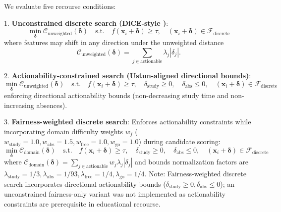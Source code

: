 \documentclass[11pt]{article}
\begin{document}
We evaluate five recourse conditions:

1. \textbf{Unconstrained discrete search (DiCE-style \cite{Mothilal2020})}:
\begin{equation}
\min_{\boldsymbol{\delta}} \mathcal{C}_{\text{unweighted}}(\boldsymbol{\delta}) \quad \text{s.t.} \quad f(\mathbf{x}_i + \boldsymbol{\delta}) \ge \tau, \quad (\mathbf{x}_i + \boldsymbol{\delta}) \in \mathcal{F}_{\text{discrete}}
\end{equation}
where features may shift in any direction under the unweighted distance
\begin{equation}
\mathcal{C}_{\text{unweighted}}(\boldsymbol{\delta})
= \sum_{j \in \text{actionable}} \lambda_j |\delta_j|.
\end{equation}

2. \textbf{Actionability-constrained search (Ustun-aligned directional bounds)}:
\begin{equation}
\min_{\boldsymbol{\delta}} \mathcal{C}_{\text{unweighted}}(\boldsymbol{\delta}) \quad \text{s.t.} \quad f(\mathbf{x}_i + \boldsymbol{\delta}) \ge \tau, \quad \delta_{\text{study}} \ge 0, \quad \delta_{\text{abs}} \le 0, \quad (\mathbf{x}_i + \boldsymbol{\delta}) \in \mathcal{F}_{\text{discrete}}
\end{equation}
enforcing directional actionability bounds (non-decreasing study time and non-increasing absences).

3. \textbf{Fairness-weighted discrete search}:
Enforces actionability constraints while incorporating domain difficulty weights $w_j$ ($w_{\text{study}}=1.0, w_{\text{abs}}=1.5, w_{\text{free}}=1.0, w_{\text{go}}=1.0$) during candidate scoring:
\begin{equation}
\min_{\boldsymbol{\delta}} \mathcal{C}_{\text{domain}}(\boldsymbol{\delta}) \quad \text{s.t.} \quad f(\mathbf{x}_i + \boldsymbol{\delta}) \ge \tau, \quad \delta_{\text{study}} \ge 0, \quad \delta_{\text{abs}} \le 0, \quad (\mathbf{x}_i + \boldsymbol{\delta}) \in \mathcal{F}_{\text{discrete}}
\end{equation}
where $\mathcal{C}_{\text{domain}}(\boldsymbol{\delta}) = \sum_{j \in \text{actionable}} w_j \lambda_j |\delta_j|$ and bounds normalization factors are $\lambda_{\text{study}}=1/3, \lambda_{\text{abs}}=1/93, \lambda_{\text{free}}=1/4, \lambda_{\text{go}}=1/4$. Note: Fairness-weighted discrete search incorporates directional actionability bounds ($\delta_{\text{study}} \ge 0, \delta_{\text{abs}} \le 0$); an unconstrained fairness-only variant was not implemented as actionability constraints are prerequisite in educational recourse.
\end{document}
